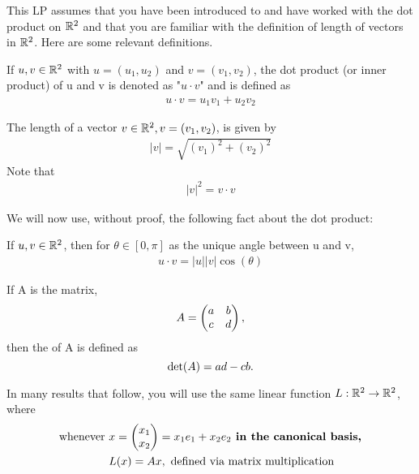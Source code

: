 \begin{question}
    \normalfont
    This LP assumes that you have been introduced to and have worked with the dot product on $\mathbb R^2$ and that you are familiar with the definition of length of vectors in $\mathbb R^2$. Here are some relevant definitions.
\end{question}

\begin{DEF}
    If $u,v\in\mathbb R^2$ with $u=(u_1,u_2)$ and $v=(v_1,v_2)$, the dot product (or inner product) of u and v is denoted as "$u\cdot v$" and is defined as 
    \[
        \begin{aligned}
            u\cdot v=u_1v_1+u_2v_2
        \end{aligned}
    \]  
\end{DEF}

\begin{DEF}
    The length of a vector $v\in\mathbb R^2,v=(v_1,v_2)$, is given by 
    \[
        \begin{aligned}
            |v|=\sqrt{(v_1)^2+(v_2)^2}
        \end{aligned}
    \]
    Note that 
    \[
        \begin{aligned}
            |v|^2=v\cdot v
        \end{aligned}
    \]
\end{DEF}
We will now use, without proof, the following fact about the dot product:
\begin{lem}
    If $u,v\in\mathbb R^2$, then for $\theta\in[0,\pi]$ as the unique angle between u and v, 
    \[
        \begin{aligned}
            u\cdot v=|u||v|\cos(\theta)
        \end{aligned}
    \]
\end{lem}

\begin{DEF}
    If A is the matrix, 
    \[
        \begin{aligned}
            A=\begin{pmatrix} a &b\\ c &d \end{pmatrix},
        \end{aligned}
    \]
    then the  of A is defined as 
    \begin{equation}
        \textnormal{det}(A)=ad-cb.
    \end{equation}
\end{DEF}
In many results that follow, you will use the same linear function $L:\mathbb R^2\rightarrow\mathbb R^2$, where 
\begin{equation}
    \begin{aligned}
        \text{whenever } &x=\begin{pmatrix} x_1\\ x_2\end{pmatrix}=x_1e_1+x_2e_2\textbf{ in the canonical basis,}\\
                        &L(x)=Ax,\text{ defined via matrix multiplication}
    \end{aligned}
\end{equation}

